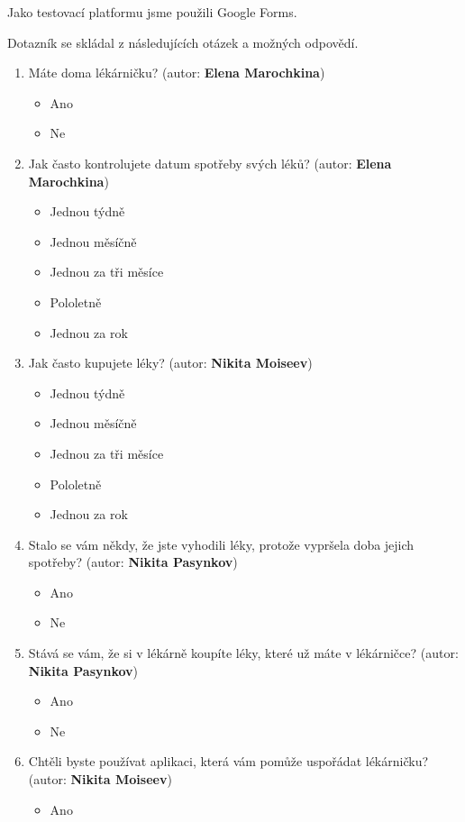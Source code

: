 \documentclass[a4paper, 11pt]{article}
\begin{document}
Jako testovací platformu jsme použili Google Forms.

Dotazník se skládal z následujících otázek a možných odpovědí.
\begin{enumerate}
\item Máte doma lékárničku? (autor: \textbf{Elena Marochkina})
\begin{itemize}
\item Ano
\item Ne
\end{itemize}
\item Jak často kontrolujete datum spotřeby svých léků? (autor: \textbf{Elena Marochkina})
\begin{itemize}
    \item Jednou týdně
    \item Jednou měsíčně
    \item Jednou za tři měsíce
    \item Pololetně
    \item Jednou za rok
\end{itemize}
\item Jak často kupujete léky? (autor: \textbf{Nikita Moiseev})
\begin{itemize}
    \item Jednou týdně
    \item Jednou měsíčně
    \item Jednou za tři měsíce
    \item Pololetně
    \item Jednou za rok
\end{itemize}
\item Stalo se vám někdy, že jste vyhodili léky, protože vypršela doba jejich spotřeby? (autor: \textbf{Nikita Pasynkov})
\begin{itemize}
\item Ano
\item Ne
\end{itemize}
\item Stává se vám, že si v lékárně koupíte léky, které už máte v lékárničce? (autor: \textbf{Nikita Pasynkov})
\begin{itemize}
\item Ano
\item Ne
\end{itemize}
\item Chtěli byste používat aplikaci, která vám pomůže uspořádat lékárničku? (autor: \textbf{Nikita Moiseev})
\begin{itemize}
\item Ano

\end{itemize}
\end{enumerate}
\end{document}
